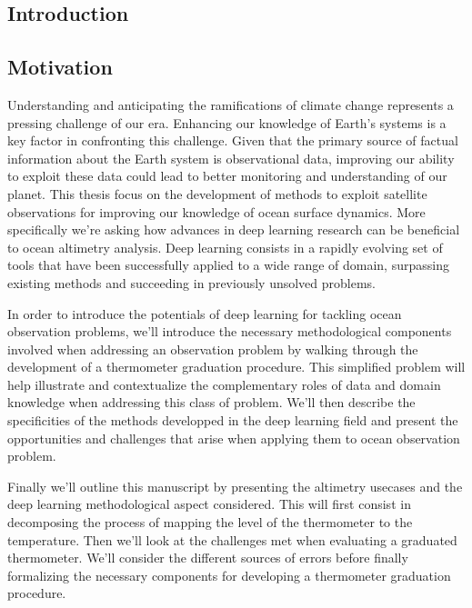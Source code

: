 \begin{bibunit}

\chapter*{Introduction}

  \section{Motivation}
Understanding and anticipating the ramifications of climate change represents a pressing challenge of our era.
Enhancing our knowledge of Earth's systems is a key factor in confronting this challenge.
  Given that the primary source of factual information about the Earth system is observational data, improving our ability to exploit these data could lead to better monitoring and understanding of our planet.
  This thesis focus on the development of methods to exploit satellite observations for improving our knowledge of ocean surface dynamics. 
  More specifically we're asking how advances in deep learning research can be beneficial to ocean altimetry analysis.
  Deep learning consists in a rapidly evolving set of tools that have been successfully applied to a wide range of domain, surpassing existing methods and succeeding in previously unsolved problems.
  
  In order to introduce the potentials of deep learning for tackling ocean observation problems, we'll introduce the necessary methodological components involved when addressing an observation problem by walking through the development of a thermometer graduation procedure. This simplified problem will help illustrate and contextualize the complementary roles of data and domain knowledge when addressing this class of problem. 
  We'll then describe the specificities of the methods developped in the deep learning field and present the opportunities and challenges that arise when applying them to ocean observation problem.

  Finally we'll outline this manuscript by presenting the altimetry usecases and the deep learning methodological aspect considered.
  This will first consist in decomposing the process of mapping the level of the thermometer to the temperature. Then we'll look at the challenges met when evaluating a graduated thermometer. We'll consider the different sources of errors before finally formalizing the necessary components for developing a thermometer graduation procedure.



\end{bibunit}
